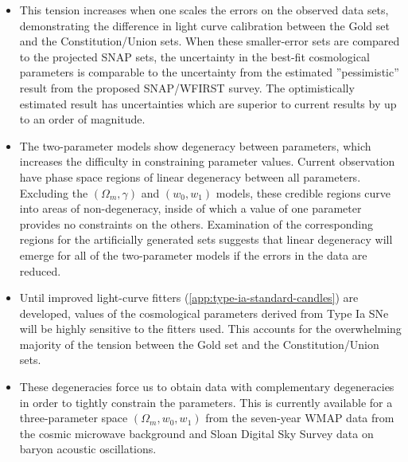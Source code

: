 \begin{itemize}
\item This tension increases when one scales the errors on the observed data sets, demonstrating the difference in light curve calibration between the Gold set and the Constitution/Union sets. When these smaller-error sets are compared to the projected SNAP sets, the uncertainty in the best-fit cosmological parameters is comparable to the uncertainty from the estimated ”pessimistic” result from the proposed SNAP/WFIRST survey. The optimistically estimated result has uncertainties which are superior to current results by up to an order of magnitude.
\item The two-parameter models show degeneracy between parameters, which increases the difficulty in constraining parameter values. Current observation have phase space regions of linear degeneracy between all parameters. Excluding the $(\Omega_m , \gamma)$ and $(w_0 , w_1)$ models, these credible regions curve into areas of non-degeneracy, inside of which a value of one parameter provides no constraints on the others. Examination of the corresponding regions for the artificially generated sets suggests that linear degeneracy will emerge for all of the two-parameter models if the errors in the data are reduced. 
\item Until improved light-curve fitters (\cref{app:type-ia-standard-candles}) are developed, values of the cosmological parameters derived from Type Ia SNe will be highly sensitive to the fitters used. This accounts for the overwhelming majority of the tension between the Gold set and the Constitution/Union sets.
\item These degeneracies force us to obtain data with complementary degeneracies in order to tightly constrain the parameters. This is currently available for a three-parameter space $(\Omega_m , w_0 , w_1 )$ from the seven-year WMAP data from the cosmic microwave background and Sloan Digital Sky Survey data on baryon acoustic oscillations.
\end{itemize}
